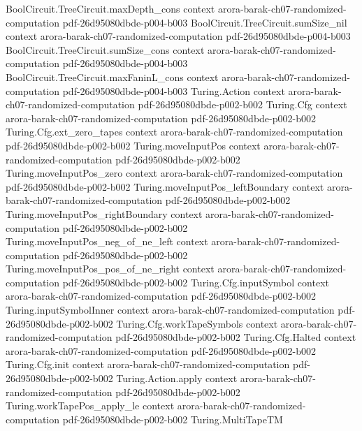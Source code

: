 \begin{theorem}
\proofstep
  {BoolCircuit.TreeCircuit.maxDepth_cons}
  {context}
  {arora-barak-ch07-randomized-computation}
  {pdf-26d95080dbde-p004-b003}
\proofstep
  {BoolCircuit.TreeCircuit.sumSize_nil}
  {context}
  {arora-barak-ch07-randomized-computation}
  {pdf-26d95080dbde-p004-b003}
\proofstep
  {BoolCircuit.TreeCircuit.sumSize_cons}
  {context}
  {arora-barak-ch07-randomized-computation}
  {pdf-26d95080dbde-p004-b003}
\proofstep
  {BoolCircuit.TreeCircuit.maxFaninL_cons}
  {context}
  {arora-barak-ch07-randomized-computation}
  {pdf-26d95080dbde-p004-b003}
\proofstep
  {Turing.Action}
  {context}
  {arora-barak-ch07-randomized-computation}
  {pdf-26d95080dbde-p002-b002}
\proofstep
  {Turing.Cfg}
  {context}
  {arora-barak-ch07-randomized-computation}
  {pdf-26d95080dbde-p002-b002}
\proofstep
  {Turing.Cfg.ext_zero_tapes}
  {context}
  {arora-barak-ch07-randomized-computation}
  {pdf-26d95080dbde-p002-b002}
\proofstep
  {Turing.moveInputPos}
  {context}
  {arora-barak-ch07-randomized-computation}
  {pdf-26d95080dbde-p002-b002}
\proofstep
  {Turing.moveInputPos_zero}
  {context}
  {arora-barak-ch07-randomized-computation}
  {pdf-26d95080dbde-p002-b002}
\proofstep
  {Turing.moveInputPos_leftBoundary}
  {context}
  {arora-barak-ch07-randomized-computation}
  {pdf-26d95080dbde-p002-b002}
\proofstep
  {Turing.moveInputPos_rightBoundary}
  {context}
  {arora-barak-ch07-randomized-computation}
  {pdf-26d95080dbde-p002-b002}
\proofstep
  {Turing.moveInputPos_neg_of_ne_left}
  {context}
  {arora-barak-ch07-randomized-computation}
  {pdf-26d95080dbde-p002-b002}
\proofstep
  {Turing.moveInputPos_pos_of_ne_right}
  {context}
  {arora-barak-ch07-randomized-computation}
  {pdf-26d95080dbde-p002-b002}
\proofstep
  {Turing.Cfg.inputSymbol}
  {context}
  {arora-barak-ch07-randomized-computation}
  {pdf-26d95080dbde-p002-b002}
\proofstep
  {Turing.inputSymbolInner}
  {context}
  {arora-barak-ch07-randomized-computation}
  {pdf-26d95080dbde-p002-b002}
\proofstep
  {Turing.Cfg.workTapeSymbols}
  {context}
  {arora-barak-ch07-randomized-computation}
  {pdf-26d95080dbde-p002-b002}
\proofstep
  {Turing.Cfg.Halted}
  {context}
  {arora-barak-ch07-randomized-computation}
  {pdf-26d95080dbde-p002-b002}
\proofstep
  {Turing.Cfg.init}
  {context}
  {arora-barak-ch07-randomized-computation}
  {pdf-26d95080dbde-p002-b002}
\proofstep
  {Turing.Action.apply}
  {context}
  {arora-barak-ch07-randomized-computation}
  {pdf-26d95080dbde-p002-b002}
\proofstep
  {Turing.workTapePos_apply_le}
  {context}
  {arora-barak-ch07-randomized-computation}
  {pdf-26d95080dbde-p002-b002}
\proofstep
  {Turing.MultiTapeTM}

\end{theorem}
